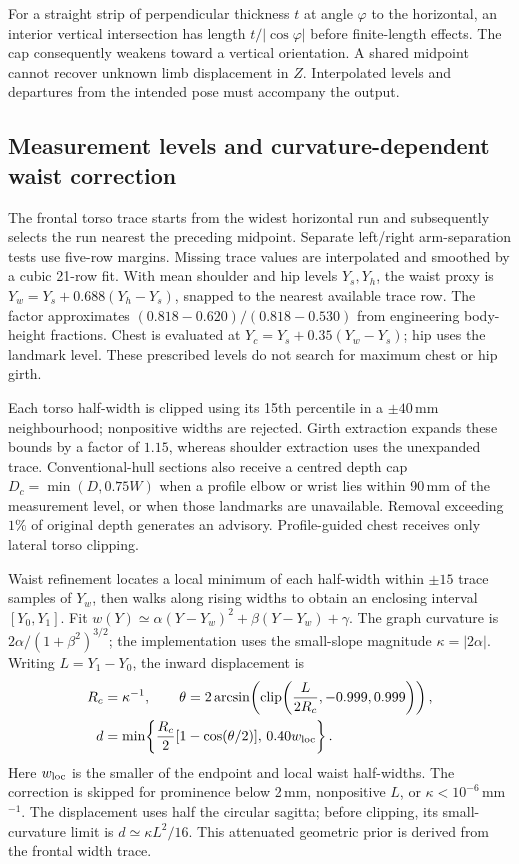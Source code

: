 \documentclass[11pt,a4paper]{article}
\newcommand{\clip}{\operatorname{clip}}
\begin{document}
For a straight strip of perpendicular thickness $t$ at angle $\varphi$ to the horizontal, an interior vertical intersection has length $t/|\cos\varphi|$ before finite-length effects. The cap consequently weakens toward a vertical orientation. A shared midpoint cannot recover unknown limb displacement in $Z$. Interpolated levels and departures from the intended pose must accompany the output.

\subsection{Measurement levels and curvature-dependent waist correction}
The frontal torso trace starts from the widest horizontal run and subsequently selects the run nearest the preceding midpoint. Separate left/right arm-separation tests use five-row margins. Missing trace values are interpolated and smoothed by a cubic 21-row fit. With mean shoulder and hip levels $Y_s,Y_h$, the waist proxy is $Y_w=Y_s+0.688(Y_h-Y_s)$, snapped to the nearest available trace row. The factor approximates $(0.818-0.620)/(0.818-0.530)$ from engineering body-height fractions. Chest is evaluated at $Y_c=Y_s+0.35(Y_w-Y_s)$; hip uses the landmark level. These prescribed levels do not search for maximum chest or hip girth.

Each torso half-width is clipped using its 15th percentile in a $\pm40$\,mm neighbourhood; nonpositive widths are rejected. Girth extraction expands these bounds by a factor of $1.15$, whereas shoulder extraction uses the unexpanded trace. Conventional-hull sections also receive a centred depth cap $D_c=\min(D,0.75W)$ when a profile elbow or wrist lies within 90\,mm of the measurement level, or when those landmarks are unavailable. Removal exceeding $1\%$ of original depth generates an advisory. Profile-guided chest receives only lateral torso clipping.

Waist refinement locates a local minimum of each half-width within $\pm15$ trace samples of $Y_w$, then walks along rising widths to obtain an enclosing interval $[Y_0,Y_1]$. Fit $w(Y)\simeq\alpha(Y-Y_w)^2+\beta(Y-Y_w)+\gamma$. The graph curvature is $2\alpha/(1+\beta^2)^{3/2}$; the implementation uses the small-slope magnitude $\kappa=|2\alpha|$. Writing $L=Y_1-Y_0$, the inward displacement is
\begin{equation}
 \begin{aligned}
 R_c&=\kappa^{-1},\qquad
 \theta=2\arcsin\!\left(\clip\!\left(\frac{L}{2R_c},-0.999,0.999\right)\right),\\
 d&=\min\!\left\{\frac{R_c}{2}[1-\cos(\theta/2)],\,0.40w_{\rm loc}\right\}.
 \end{aligned}
 \label{eq:waist}
\end{equation}
Here $w_{\rm loc}$ is the smaller of the endpoint and local waist half-widths. The correction is skipped for prominence below 2\,mm, nonpositive $L$, or $\kappa<10^{-6}$\,mm$^{-1}$. The displacement uses half the circular sagitta; before clipping, its small-curvature limit is $d\simeq\kappa L^2/16$. This attenuated geometric prior is derived from the frontal width trace.
\end{document}
